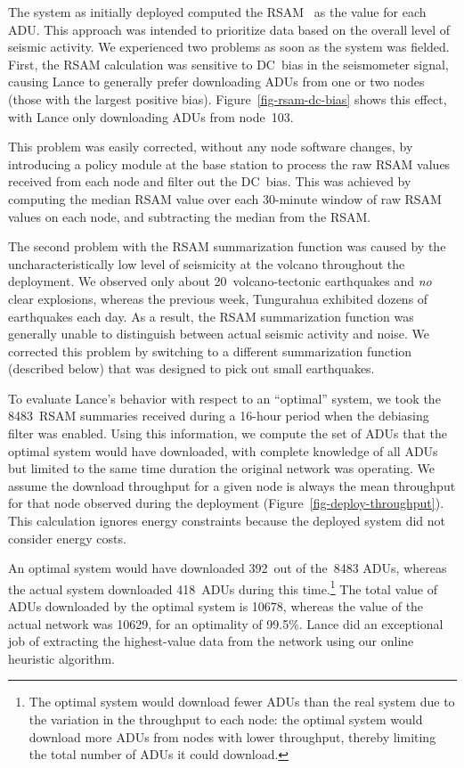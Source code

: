 \documentclass[lettersize]{sig-alternate-konrad}
\begin{document}
The system as initially deployed computed the RSAM~\cite{rsam} as the
value for each ADU.
This approach was intended to prioritize data based on
the overall level of seismic activity. We experienced two problems as
soon as the system was fielded. First, the RSAM calculation was
sensitive to DC~bias in the seismometer signal, causing Lance to 
generally prefer downloading ADUs from one or two nodes (those with
the largest positive bias). Figure~\ref{fig-rsam-dc-bias} shows this
effect, with Lance only downloading ADUs from node~103.

This problem was easily corrected, without any node software changes,
by introducing a policy module at the base station to process the 
raw RSAM values received
from each node and filter out the DC~bias. This was achieved by
computing the median RSAM value over each 30-minute window of raw RSAM
values on each node, and subtracting the median from the RSAM.

The second problem with the RSAM summarization function was caused
by the uncharacteristically low level of seismicity at the volcano
throughout the deployment. We observed only about 20~volcano-tectonic 
earthquakes and {\em no} clear explosions, whereas the previous week,
Tungurahua exhibited dozens of earthquakes each day. As a result, the
RSAM summarization function was generally unable to distinguish between
actual seismic activity and noise. We corrected this problem by
switching to a different summarization function (described below)
that was designed to pick out small earthquakes. 

To evaluate Lance's behavior with respect to an ``optimal'' system, we took
the 8483~RSAM summaries received during a 16-hour period when the debiasing
filter was enabled. Using this information, we compute the set of ADUs that
the optimal system would have downloaded, with complete knowledge of all ADUs
but limited to the same time duration the original network was operating.  We
assume the download throughput for a given node is always the mean throughput
for that node observed during the deployment
  (Figure~\ref{fig-deploy-throughput}). This calculation ignores energy
  constraints because the deployed system did not consider energy costs.

An optimal system would have downloaded 392~out of the~8483 ADUs,
whereas the actual system downloaded 418~ADUs during this 
time.\footnote{The optimal system would download fewer ADUs 
than the real system due to the variation in the throughput to each 
node: the optimal system would download more ADUs from nodes 
with lower throughput, thereby limiting the total number of ADUs it could
download.} The total value of ADUs downloaded by the optimal system 
is 10678, whereas the value of the actual network was 10629, for an
optimality of 99.5\%. Lance did an exceptional job of extracting the
highest-value data from the network using our online heuristic
algorithm.
\end{document}
